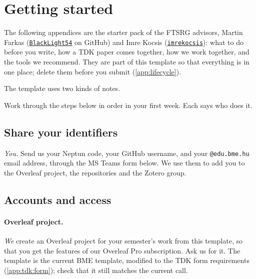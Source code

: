 \clearpage\section{Getting started}\label{app:start}
The following appendices are the starter pack of the FTSRG advisors, Martin Farkas (\href{https://github.com/BlackLight54}{\texttt{BlackLight54}} on GitHub) and Imre Kocsis (\href{https://github.com/imrekocsis}{\texttt{imrekocsis}}): what to do before you write, how a TDK paper comes together, how we work together, and the tools we recommend.
They are part of this template so that everything is in one place; delete them before you submit (\cref{app:lifecycle}).

The template uses two kinds of notes. 

Work through the steps below in order in your first week. Each says who does it.

\subsection{Share your identifiers}\label{app:start:ids}
\emph{You.} Send us your Neptun code, your GitHub username, and your \texttt{@edu.bme.hu} email address, through the MS Teams form below. We use them to add you to the Overleaf project, the repositories and the Zotero group.

\subsection{Accounts and access}\label{app:start:access}
\paragraph{Overleaf project.} \emph{We} create an Overleaf project for your semester's work from this template, so that you get the features of our Overleaf Pro subscription. Ask us for it. The template is the current BME template, modified to the TDK form requirements (\cref{app:tdk:form}); check that it still matches the current call.

